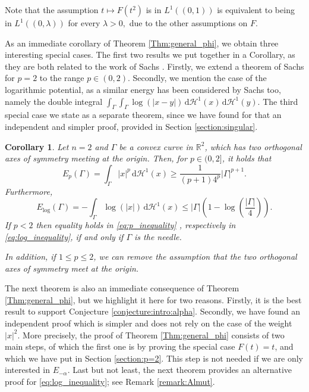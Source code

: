 \documentclass[10pt,leqno]{amsart}
\newcommand{\R}[0]{\mathbb{R}}
\newcommand{\dHo}{\, \mathrm{d} \mathcal{H}^{1}}
\numberwithin{Theorem}{section}
\newtheorem{Corollary}[Theorem]{Corollary}
\theoremstyle{definition}
\theoremstyle{remark}
\numberwithin{equation}{section}
\numberwithin{equation}{section}
\begin{document}
Note that the assumption $t\mapsto F(t^2)$ is in $L^1((0,1))$ is equivalent to being in $L^1((0,\lambda))$ for every $\lambda>0,$ due to the other assumptions on $F.$ 
    
As an immediate corollary of Theorem \ref{Thm:general_phi}, we obtain three interesting special cases. The first two results we put together in a Corollary, as they are both related to the work of Sachs \cite{SachsIandII}. Firstly, we extend a theorem of Sachs for $p=2$ to the range $p\in (0,2)$. Secondly, we mention the case of the logarithmic potential, as a similar energy has been considered by Sachs too, namely the double integral 
$
\int_{\Gamma}\int_{\Gamma}\log(|x-y|)\dHo(x)\dHo(y).
$
The third special case we state as a separate theorem, since we have found for that an independent and simpler proof, provided in Section \ref{section:singular}.

\begin{Corollary} \label{Cor:intro:p and log ineq}
    Let $n=2$ and $\Gamma$ be a convex curve in $\R^2$, which has two orthogonal axes of symmetry meeting at the origin.   Then, for $p \in (0,2]$, it holds that
    \begin{equation} \label{eq:p_inequality}
        E_p(\Gamma)=\int_{\Gamma} |x|^{p} \dHo(x) \geq \frac{1}{(p+1)4^p} |\Gamma|^{p+1}.
    \end{equation}
    Furthermore,
    \begin{equation} \label{eq:log_inequality}
        E_{\log}(\Gamma)= -\int_{\Gamma} \log(|x|) \dHo(x) \leq |\Gamma| \left( 1- \log \left(\frac{|\Gamma|}{4} \right)\right).
    \end{equation}
    If $p<2$ then equality holds in \eqref{eq:p_inequality} , respectively in \eqref{eq:log_inequality}, if and only if $\Gamma$ is the needle. 
    
    In addition, if $1 \leq p\leq 2$, we can remove the assumption that the two orthogonal axes of symmetry meet at the origin.
\end{Corollary}






The next theorem is also an immediate consequence of Theorem \ref{Thm:general_phi}, but we highlight it here for two reasons. Firstly, it is the best result to support Conjecture \ref{conjecture:intro:alpha}. Secondly, we have found an independent proof which is simpler and does not rely on the case of the weight $|x|^2$. More precisely, the proof of Theorem \ref{Thm:general_phi} consists of two main steps, of which the first one is by proving the special case $F(t)=t$, and which we have put in Section \ref{section:p=2}. This step is not needed if we are only interested in $E_{-\alpha}.$ Last but not least, the next theorem provides an alternative proof for \eqref{eq:log_inequality}; see Remark \ref{remark:Almut}.
\end{document}

